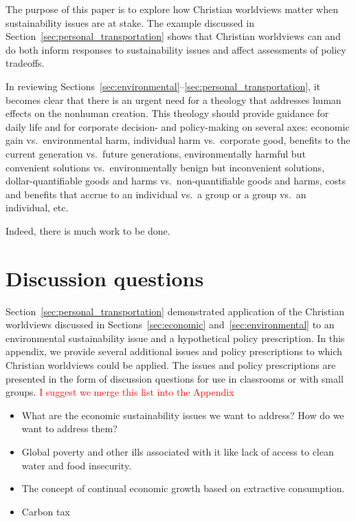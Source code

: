 \documentclass[12pt]{article}
\newcommand{\ins}[1]{\textcolor{red}{#1}}
\begin{document}

The purpose of this paper is to explore how
Christian worldviews matter 
when sustainability issues are at stake. 
The example discussed in Section~\ref{sec:personal_transportation} shows that
Christian worldviews can and do 
both inform responses to sustainability issues
and affect assessments of policy tradeoffs.

In reviewing Sections~\ref{sec:environmental}--\ref{sec:personal_transportation},
it becomes clear that there is an urgent need for a theology 
that addresses human effects on the nonhuman creation.
This theology should provide guidance for daily life and 
for corporate decision- and policy-making on several axes:
economic gain vs.\ environmental harm, 
individual harm vs.\ corporate good, 
benefits to the current generation vs.\ future generations,
environmentally harmful but convenient solutions vs.\ environmentally benign but inconvenient solutions, 
dollar-quantifiable goods and harms vs.\ non-quantifiable goods and harms,
costs and benefits that accrue to an individual vs.\ a group
or a group vs.\ an individual, etc.

Indeed, there is much work to be done.


\appendix

\section{Discussion questions}
\label{sec:discussion_questions}

Section~\ref{sec:personal_transportation} demonstrated application of 
the Christian worldviews discussed in Sections~\ref{sec:economic} and~\ref{sec:environmental}
to an environmental sustainability issue and a hypothetical policy prescription.
In this appendix, we provide several additional issues and policy prescriptions 
to which Christian worldviews could be applied.
The issues and policy prescriptions are presented in the form of discussion questions
for use in classrooms or with small groups.
%
\ins{I suggest we merge this  list into the Appendix}
\begin{itemize}
\item{What are the economic sustainability issues we want to address? How do we want to address them?}
\item{Global poverty and other ills associated with it like lack of access to clean water and food insecurity.}
\item{The concept of continual economic growth based on extractive consumption.}
\item{Carbon tax}
\end{itemize}
\end{document}
